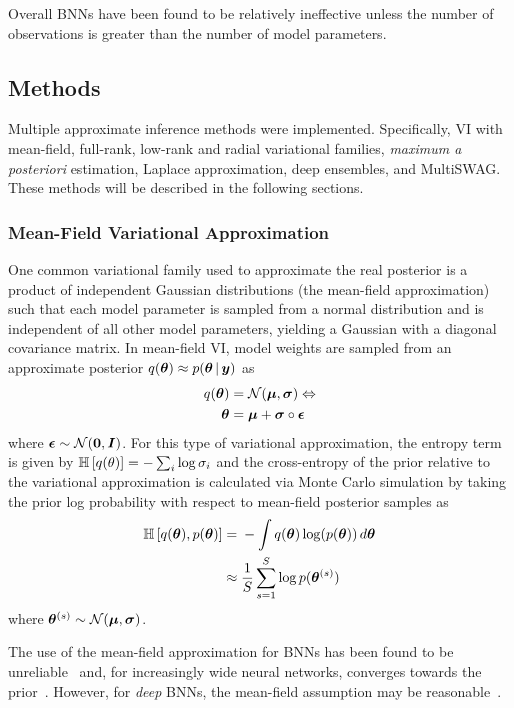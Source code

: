 \documentclass[10pt,a4paper,twocolumn]{article}
\begin{document}
Overall BNNs have been found to be relatively ineffective unless the number of observations is greater than the number of model parameters.

\subsection{Methods}\label{ssec:methods}

Multiple approximate inference methods were implemented.
Specifically, VI with mean-field, full-rank, low-rank and radial variational families, \emph{maximum a posteriori} estimation, Laplace approximation, deep ensembles, and MultiSWAG.
These methods will be described in the following sections.

\subsubsection{Mean-Field Variational Approximation}\label{ssec:mfvi}
One common variational family used to approximate the real posterior is a product of independent Gaussian distributions (the mean-field approximation) such that each model parameter is sampled from a normal distribution and is independent of all other model parameters, yielding a Gaussian with a diagonal covariance matrix.
In mean-field VI, model weights are sampled from an approximate posterior \(q(\bm \theta) \approx p(\bm{\theta} \, | \, \bm y)\) as
\begin{align}
    q(\bm \theta) ={}& \mathcal{N}(\bm \mu, \bm \sigma) \Leftrightarrow \nonumber\\
    \bm{\theta} ={}& \bm{\mu} + \bm{\sigma} \circ \bm{\epsilon}\label{eq:meanfield}
\end{align}
where \(\bm{\epsilon} \sim \mathcal{N}(\bm 0, \bm{I})\).
For this type of variational approximation, the entropy term is given by \(\mathbb{H}\left[q(\theta)\right] = - \sum_i \log \sigma_i\) and the cross-entropy of the prior relative to the variational approximation is calculated via Monte Carlo simulation by taking the prior log probability with respect to mean-field posterior samples as
\begin{align}
    \mathbb{H}\left[q(\bm\theta), p(\bm\theta)\right] ={}& - \int q(\bm\theta) \log(p(\bm\theta))\,d\bm\theta \nonumber\\
    \approx{}& \frac{1}{S} \sum^S_{s=1} \log p(\bm{\theta}^{(s)})
\end{align}
where \(\bm{\theta}^{(s)} \sim \mathcal{N}(\bm{\mu}, \bm{\sigma})\).

The use of the mean-field approximation for BNNs has been found to be unreliable~\cite{wu2018deterministic} and, for increasingly wide neural networks, converges towards the prior~\cite{coker2021wide}.
However, for \emph{deep} BNNs, the mean-field assumption may be reasonable~\cite{farquhar2020liberty}.
\end{document}
